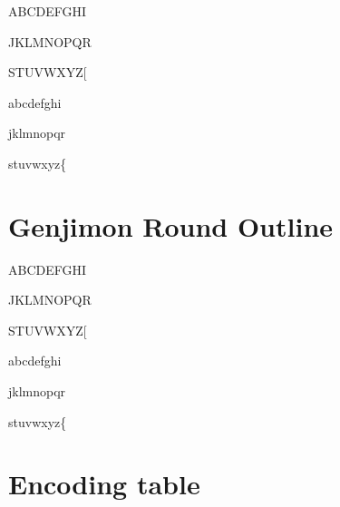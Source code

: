 \documentclass[12pt]{article}
\begin{document}
{
ABCDEFGHI

JKLMNOPQR

STUVWXYZ[

abcdefghi

jklmnopqr

stuvwxyz\{}

\clearpage


\section{Genjimon Round Outline}

{
ABCDEFGHI

JKLMNOPQR

STUVWXYZ[

abcdefghi

jklmnopqr

stuvwxyz\{}

\clearpage


\section{Encoding table}
\end{document}

